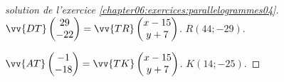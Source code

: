 \documentclass[main.tex]{subfiles}
\begin{document}
\begin{proof}[solution de l'exercice  \ref{chapter06:exercices:parallelogrammes04}]   
	
	$\vv{DT}\begin{pmatrix}
		29\\ -22 
	\end{pmatrix} =\vv{TR}\begin{pmatrix}
		x-15\\ y+7
	\end{pmatrix}$. $R(44;-29)$.
	
	$\vv{AT}\begin{pmatrix}
		-1\\ -18 
	\end{pmatrix} =\vv{TK}\begin{pmatrix}
		x-15\\ y+7
	\end{pmatrix}$. $K(14;-25)$.
\end{proof}
\end{document}

